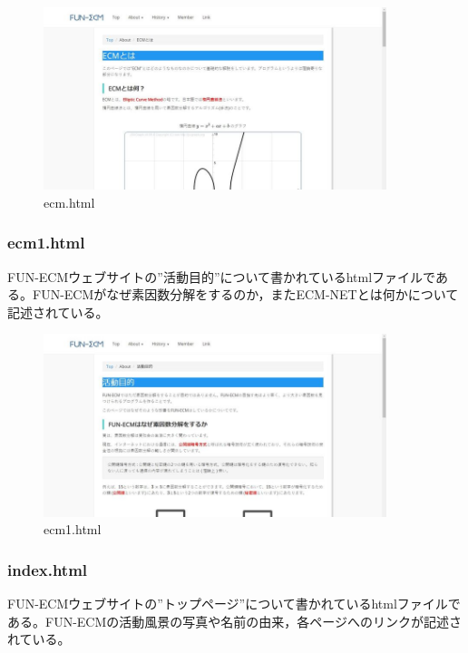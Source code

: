 \documentclass[openany,11pt,papersize]{jsbook}
\begin{document}
\begin{figure}[H]
  \begin{center} %
    \includegraphics[clip, width=10.0cm]{./figure/ecm.png}
    \caption{ecm.html} %
    \label{ecm} %
  \end{center}
\end{figure}

\subsubsection{ecm1.html}
FUN-ECMウェブサイトの”活動目的”について書かれているhtmlファイルである。FUN-ECMがなぜ素因数分解をするのか，またECM-NETとは何かについて記述されている。

\begin{figure}[H]
  \begin{center} %
    \includegraphics[clip, width=10.0cm]{./figure/ecm1.png}
    \caption{ecm1.html} %
    \label{ecm1} %
  \end{center}
\end{figure}

\subsubsection{index.html}
FUN-ECMウェブサイトの”トップページ”について書かれているhtmlファイルである。FUN-ECMの活動風景の写真や名前の由来，各ページへのリンクが記述されている。
\end{document}

